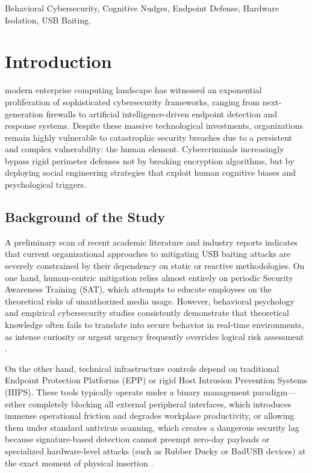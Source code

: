 \documentclass{ieeeaccess}
\begin{document}
\begin{keywords}
Behavioral Cybersecurity, Cognitive Nudges, Endpoint Defense, Hardware Isolation, USB Baiting.
\end{keywords}

\titlepgskip=-15pt
\maketitle

\section{Introduction}
\label{sec:introduction}
 modern enterprise computing landscape has witnessed an exponential proliferation of sophisticated cybersecurity frameworks, ranging from next-generation firewalls to artificial intelligence-driven endpoint detection and response systems. Despite these massive technological investments, organizations remain highly vulnerable to catastrophic security breaches due to a persistent and complex vulnerability: the human element. Cybercriminals increasingly bypass rigid perimeter defenses not by breaking encryption algorithms, but by deploying social engineering strategies that exploit human cognitive biases and psychological triggers.

 \subsection{Background of the Study}
A preliminary scan of recent academic literature and industry reports indicates that current organizational approaches to mitigating USB baiting attacks are severely constrained by their dependency on static or reactive methodologies. On one hand, human-centric mitigation relies almost entirely on periodic Security Awareness Training (SAT), which attempts to educate employees on the theoretical risks of unauthorized media usage. However, behavioral psychology and empirical cybersecurity studies consistently demonstrate that theoretical knowledge often fails to translate into secure behavior in real-time environments, as intense curiosity or urgent urgency frequently overrides logical risk assessment \cite{ref1}.

On the other hand, technical infrastructure controls depend on traditional Endpoint Protection Platforms (EPP) or rigid Host Intrusion Prevention Systems (HIPS). These tools typically operate under a binary management paradigm—either completely blocking all external peripheral interfaces, which introduces immense operational friction and degrades workplace productivity, or allowing them under standard antivirus scanning, which creates a dangerous security lag because signature-based detection cannot preempt zero-day payloads or specialized hardware-level attacks (such as Rubber Ducky or BadUSB devices) at the exact moment of physical insertion \cite{ref2}.
\end{document}
